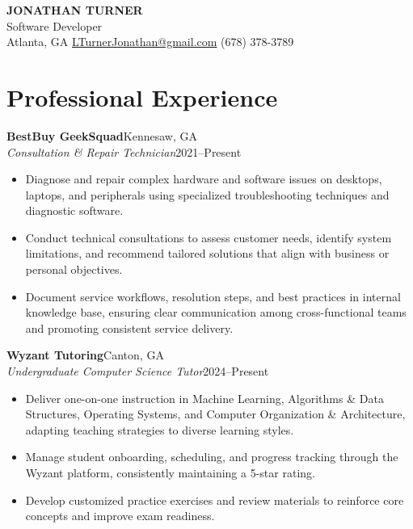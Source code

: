 \documentclass[letterpaper,10pt]{article}
\begin{document}
\begin{center}
{\LARGE\bfseries JONATHAN TURNER}\\[0.4em]
\fontsize{1.5em}{1.5em}\selectfont Software Developer \\[0.2em] 
\normalsize
Atlanta, GA \quad \textbar\quad \href{mailto:LTurnerJonathan@gmail.com}{LTurnerJonathan@gmail.com} \quad \textbar\quad (678) 378-3789 \\
\end{center}\vspace{1em}

\section{Professional Experience}
\noindent\textbf{BestBuy GeekSquad}\hfill Kennesaw, GA\\
\textit{Consultation \& Repair Technician}\hfill 2021--Present
\begin{itemize}[leftmargin=*]
    \item Diagnose and repair complex hardware and software issues on desktops, laptops, and peripherals using specialized troubleshooting techniques and diagnostic software.
    \item Conduct technical consultations to assess customer needs, identify system limitations, and recommend tailored solutions that align with business or personal objectives.
    \item Document service workflows, resolution steps, and best practices in internal knowledge base, ensuring clear communication among cross-functional teams and promoting consistent service delivery. 

\end{itemize}

\noindent\textbf{Wyzant Tutoring}\hfill Canton, GA\\
\textit{Undergraduate Computer Science Tutor}\hfill 2024--Present
\begin{itemize}[leftmargin=*]
    \item Deliver one-on-one instruction in Machine Learning, Algorithms \& Data Structures, Operating Systems, and Computer Organization \& Architecture, adapting teaching strategies to diverse learning styles.
    \item Manage student onboarding, scheduling, and progress tracking through the Wyzant platform, consistently maintaining a 5-star rating.
    \item Develop customized practice exercises and review materials to reinforce core concepts and improve exam readiness.
\end{itemize}
\end{document}
